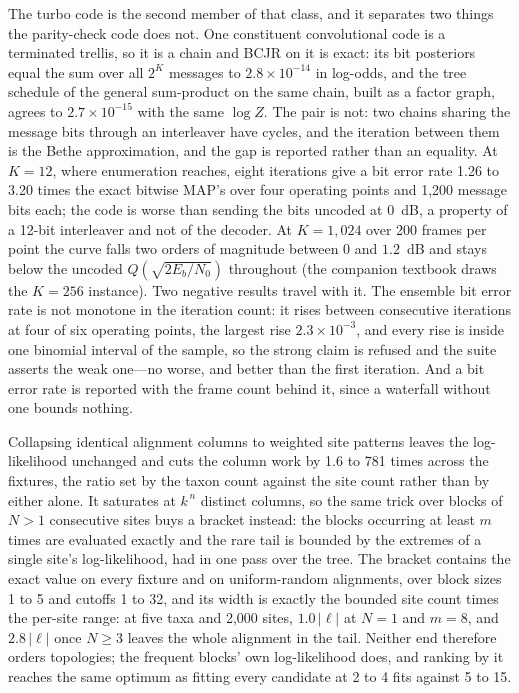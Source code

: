 \documentclass[11pt,a4paper]{article}
\begin{document}
The turbo code is the second member of that class, and it separates two
things the parity-check code does not. One constituent convolutional code is
a terminated trellis, so it is a chain and BCJR on it is exact: its bit
posteriors equal the sum over all $2^{K}$ messages to $2.8 \times 10^{-14}$
in log-odds, and the tree schedule of the general sum-product on the same
chain, built as a factor graph, agrees to $2.7 \times 10^{-15}$ with the same
$\log Z$. The pair is not: two chains sharing the message bits through an
interleaver have cycles, and the iteration between them is the Bethe
approximation, and the gap is reported rather than an equality. At $K = 12$,
where enumeration reaches, eight iterations give a bit error rate 1.26 to 3.20
times the exact bitwise MAP's over four operating points and 1,200 message bits
each; the code is worse than sending the bits uncoded at $0$~dB, a property of
a 12-bit interleaver and not of the decoder.
At $K = 1{,}024$ over 200 frames per point the curve falls two orders of
magnitude between $0$ and $1.2$~dB and stays below the uncoded
$Q(\sqrt{2E_b/N_0})$ throughout (the companion textbook draws the $K = 256$
instance). Two negative results travel with it.
The ensemble bit error rate is not monotone in the iteration count: it rises
between consecutive iterations at four of six operating points, the largest
rise $2.3 \times 10^{-3}$, and every rise is inside one binomial interval of
the sample, so the strong claim is refused and the suite asserts the weak
one---no worse, and better than the first iteration. And a bit error rate is
reported with the frame count behind it, since a waterfall without one bounds
nothing.

Collapsing identical alignment columns to weighted site patterns leaves the
log-likelihood unchanged and cuts the column work by 1.6 to 781 times across
the fixtures, the ratio set by the taxon count against the site count rather
than by either alone. It saturates at $k^{\,n}$ distinct columns, so the same
trick over blocks of $N > 1$ consecutive sites buys a bracket instead: the
blocks occurring at least $m$ times are evaluated exactly and the rare tail is
bounded by the extremes of a single site's log-likelihood, had in one pass
over the tree. The bracket contains the exact value on every fixture and on
uniform-random alignments, over block sizes 1 to 5 and cutoffs 1 to 32, and
its width is exactly the bounded site count times the per-site range: at five
taxa and 2,000 sites, $1.0\,|\ell|$ at $N = 1$ and $m = 8$, and $2.8\,|\ell|$
once $N \ge 3$ leaves the whole alignment in the tail. Neither end therefore
orders topologies; the frequent blocks' own log-likelihood does, and ranking
by it reaches the same optimum as fitting every candidate at 2 to 4 fits
against 5 to 15.
\end{document}
